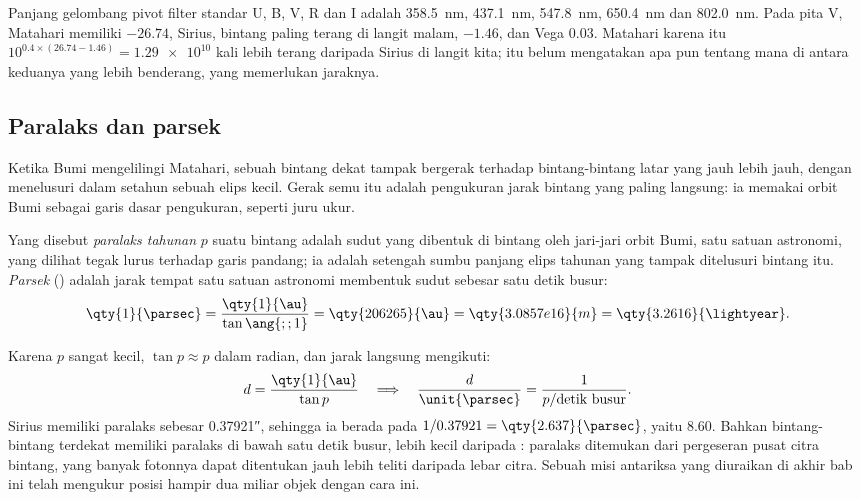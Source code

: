 Panjang gelombang pivot filter standar U, B, V, R dan I adalah \qty{358.5}{nm}, \qty{437.1}{nm}, \qty{547.8}{nm}, \qty{650.4}{nm} dan
\qty{802.0}{nm}.
Pada pita V, Matahari memiliki  $-26.74$, Sirius, bintang paling terang di langit malam, $-1.46$, dan Vega $0.03$. Matahari karena itu $10^{0.4\times(26.74 - 1.46)} = \num{1.29e10}$ kali lebih terang daripada Sirius di langit kita; itu belum mengatakan apa pun tentang mana di antara keduanya yang lebih benderang, yang memerlukan jaraknya.

\subsection*{Paralaks dan parsek}

Ketika Bumi mengelilingi Matahari, sebuah bintang dekat tampak bergerak terhadap bintang-bintang latar yang jauh lebih jauh, dengan menelusuri dalam setahun sebuah elips kecil. Gerak semu itu adalah pengukuran jarak bintang yang paling langsung: ia memakai orbit Bumi sebagai garis dasar pengukuran, seperti juru ukur.

\begin{definition}\label{def:b1:observing-the-sky:parallax}
Yang disebut \emph{paralaks tahunan} $p$ suatu bintang adalah sudut yang dibentuk di bintang oleh jari-jari orbit Bumi, satu satuan astronomi, yang dilihat tegak lurus terhadap garis pandang; ia adalah setengah sumbu panjang elips tahunan yang tampak ditelusuri bintang itu. \emph{Parsek} (\unit{\parsec}) adalah jarak tempat satu satuan astronomi membentuk sudut sebesar satu detik busur:
\[
  \qty{1}{\parsec} = \frac{\qty{1}{\au}}{\tan\ang{;;1}} = \qty{206265}{\au}
  = \qty{3.0857e16}{m} = \qty{3.2616}{\lightyear} .
\]
\end{definition}

Karena $p$ sangat kecil, $\tan p \approx p$ dalam radian, dan jarak langsung mengikuti:
\[
  d = \frac{\qty{1}{\au}}{\tan p} \quad\Longrightarrow\quad
  \frac{d}{\unit{\parsec}} = \frac{1}{p/\text{detik busur}} .
\]
Sirius memiliki paralaks sebesar \ang{;;0.37921}, sehingga ia berada pada $1/0.37921 =
\qty{2.637}{\parsec}$, yaitu \qty{8.60}{\lightyear}. Bahkan bintang-bintang terdekat memiliki paralaks di bawah satu detik busur, lebih kecil daripada : paralaks ditemukan dari pergeseran pusat citra bintang, yang banyak fotonnya dapat ditentukan jauh lebih teliti daripada lebar citra. Sebuah misi antariksa yang diuraikan di akhir bab ini telah mengukur posisi hampir dua miliar objek dengan cara ini.

